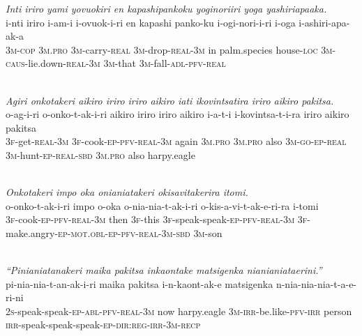 \documentclass[output=paper]{LSP/langsci}
\begin{document}
\begin{exe}
\ex \label{Emapp09}
\glt \textit{Inti iriro yami yovuokiri en kapashipankoku yoginoriiri yoga yashiriapaaka.}\\
\gll i-nti iriro i-am-i i-ovuok-i-ri en kapashi panko-ku i-ogi-nori-i-ri i-oga i-ashiri-apa-ak-a\\
\textsc{3m-cop} \textsc{3m.pro} \textsc{3m-}carry\textsc{{}-real} \textsc{3m-}drop\textsc{{}-real-3m} in palm.species house\textsc{{}-loc} \textsc{3m-caus-}lie.down\textsc{{}-real-3m} \textsc{3m-}that \textsc{3m-}fall\textsc{{}-adl-pfv-real}\\
\glt {}\\
\end{exe}
 
\begin{exe}
\ex \label{Emapp10}
\glt \textit{Agiri onkotakeri aikiro iriro iriro aikiro iati ikovintsatira iriro aikiro pakitsa.}\\
\gll o-ag-i-ri o-onko-t-ak-i-ri aikiro iriro iriro aikiro i-a-t-i i-kovintsa-t-i-ra iriro aikiro pakitsa\\
\textsc{3f-}get\textsc{{}-real-3m} \textsc{3f-}cook\textsc{{}-ep-pfv-real-3m} again \textsc{3m.pro} \textsc{3m.pro} also \textsc{3m-go-ep-real} \textsc{3m-}hunt\textsc{{}-ep-real-sbd} \textsc{3m.pro} also harpy.eagle\\
\glt {}\\
\end{exe}
 
\begin{exe}
\ex \label{Emapp11}
\glt \textit{Onkotakeri impo oka onianiatakeri okisavitakerira itomi.}\\
\gll o-onko-t-ak-i-ri impo o-oka o-nia-nia-t-ak-i-ri o-kis-a-vi-t-ak-e-ri-ra i-tomi\\
 \textsc{3f-}cook\textsc{{}-ep-pfv-real-3m} then \textsc{3f-}this \textsc{3f-}speak-speak\textsc{{}-ep-pfv-real-3m} \textsc{3f-}make.angry\textsc{{}-ep-mot.obl-ep-pfv-real-3m-sbd} \textsc{3m-}son\\
\glt {}\\
\end{exe}
 
\begin{exe}
\ex \label{Emapp12}
\glt \textit{``Pinianiatanakeri maika pakitsa inkaontake matsigenka nianianiataerini.''}\\
\gll pi-nia-nia-t-an-ak-i-ri maika pakitsa i-n-kaont-ak-e matsigenka n-nia-nia-nia-t-a-e-ri-ni\\
 \textsc{2s-}speak-speak\textsc{{}-ep-abl-pfv-real-3m} now harpy.eagle \textsc{3m-irr-}be.like\textsc{{}-pfv-irr} person \textsc{irr-}speak-speak-speak\textsc{{}-ep-dir:reg-irr-3m-recp}\\
\glt {}\\
\end{exe}
 
\end{document}
